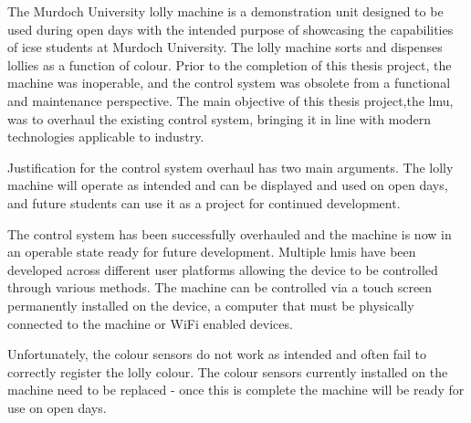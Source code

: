 The Murdoch University lolly machine is a demonstration unit designed to be used during open days with the intended purpose of showcasing the capabilities of \acrlong{icse} students at Murdoch University. The lolly machine sorts and dispenses lollies as a function of colour.  Prior to the completion of this thesis project, the machine was inoperable, and the control system was obsolete from a functional and maintenance perspective. The main objective of this thesis project,the \acrlong{lmu}, was to overhaul the existing control system, bringing it in line with modern technologies applicable to industry. 

Justification for the control system overhaul has two main arguments. The lolly machine will operate as intended and can be displayed and used on open days, and future students can use it as a project for continued development. 

The control system has been successfully overhauled and the machine is now in an operable state ready for future development. Multiple \acrlong{hmi}s have been developed across different user platforms allowing the device to be controlled through various methods. The machine can be controlled via a touch screen permanently installed on the device, a computer that must be physically connected to the machine or WiFi enabled devices. 

Unfortunately, the colour sensors do not work as intended and often fail to correctly register the lolly colour. The colour sensors currently installed on the machine need to be replaced - once this is complete the machine will be ready for use on open days. 